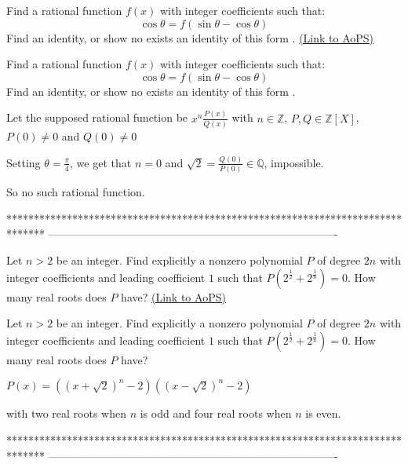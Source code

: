 \begin{problem}
	Find a rational function $f(x)$ with integer coefficients such that:
\[\cos \theta = f(\sin \theta - \cos \theta)\]
Find an identity, or show no exists an identity of this form .
	\flushright \href{https://artofproblemsolving.com/community/c6h566439}{(Link to AoPS)}
\end{problem}



\begin{solution}
	\begin{tcolorbox}Find a rational function $f(x)$ with integer coefficients such that:
\[\cos \theta = f(\sin \theta - \cos \theta)\]
Find an identity, or show no exists an identity of this form .\end{tcolorbox}
Let the supposed rational function be $x^n\frac {P(x)}{Q(x)}$ with $n\in\mathbb Z$, $P,Q\in\mathbb Z[X]$, $P(0)\ne 0$ and $Q(0)\ne 0$

Setting $\theta=\frac{\pi}4$, we get that $n=0$ and $\sqrt 2=\frac{Q(0)}{P(0)}\in\mathbb Q$, impossible.

So no such rational function.
\end{solution}
*******************************************************************************
-------------------------------------------------------------------------------

\begin{problem}
	Let $n>2$ be an integer. Find explicitly a nonzero polynomial $P$ of degree $2n$ with integer coefficients and leading coefficient $1$ such that $P(2^{\frac{1}{2}}+ 2^{\frac{1}{n}})=0$. How many real roots does $P$ have?
	\flushright \href{https://artofproblemsolving.com/community/c6h566458}{(Link to AoPS)}
\end{problem}



\begin{solution}
	\begin{tcolorbox}Let $n>2$ be an integer. Find explicitly a nonzero polynomial $P$ of degree $2n$ with integer coefficients and leading coefficient $1$ such that $P(2^{\frac{1}{2}}+ 2^{\frac{1}{n}})=0$. How many real roots does $P$ have?\end{tcolorbox}
$P(x)=\left((x+\sqrt 2)^n-2\right)\left((x-\sqrt 2)^n-2\right)$

with two real roots when $n$ is odd and four real roots when $n$ is even.
\end{solution}
*******************************************************************************
-------------------------------------------------------------------------------

